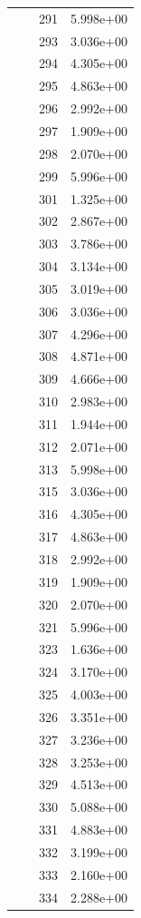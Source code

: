 \documentclass[12pt]{article}
\begin{document}
\begin{longtable}{@{}cccc@{}}
 &  & 291 & 5.998e+00 \\
 &  & 293 & 3.036e+00 \\
 &  & 294 & 4.305e+00 \\
 &  & 295 & 4.863e+00 \\
 &  & 296 & 2.992e+00 \\
 &  & 297 & 1.909e+00 \\
 &  & 298 & 2.070e+00 \\
 &  & 299 & 5.996e+00 \\
 &  & 301 & 1.325e+00 \\
 &  & 302 & 2.867e+00 \\
 &  & 303 & 3.786e+00 \\
 &  & 304 & 3.134e+00 \\
 &  & 305 & 3.019e+00 \\
 &  & 306 & 3.036e+00 \\
 &  & 307 & 4.296e+00 \\
 &  & 308 & 4.871e+00 \\
 &  & 309 & 4.666e+00 \\
 &  & 310 & 2.983e+00 \\
 &  & 311 & 1.944e+00 \\
 &  & 312 & 2.071e+00 \\
 &  & 313 & 5.998e+00 \\
 &  & 315 & 3.036e+00 \\
 &  & 316 & 4.305e+00 \\
 &  & 317 & 4.863e+00 \\
 &  & 318 & 2.992e+00 \\
 &  & 319 & 1.909e+00 \\
 &  & 320 & 2.070e+00 \\
 &  & 321 & 5.996e+00 \\
 &  & 323 & 1.636e+00 \\
 &  & 324 & 3.170e+00 \\
 &  & 325 & 4.003e+00 \\
 &  & 326 & 3.351e+00 \\
 &  & 327 & 3.236e+00 \\
 &  & 328 & 3.253e+00 \\
 &  & 329 & 4.513e+00 \\
 &  & 330 & 5.088e+00 \\
 &  & 331 & 4.883e+00 \\
 &  & 332 & 3.199e+00 \\
 &  & 333 & 2.160e+00 \\
 &  & 334 & 2.288e+00 \\

\end{longtable}
\end{document}
